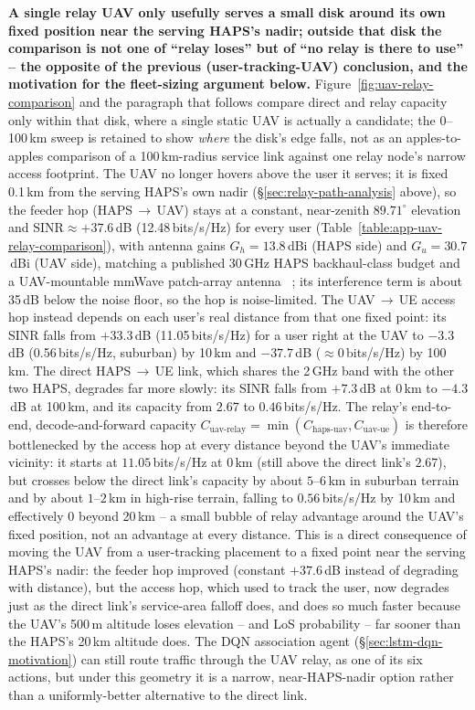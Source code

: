 \documentclass[conference]{IEEEtran}
\begin{document}
\noindent\textbf{A single relay UAV only usefully serves a small disk around its own
fixed position near the serving HAPS's nadir; outside that disk the comparison is not
one of ``relay loses'' but of ``no relay is there to use'' -- the opposite of the
previous (user-tracking-UAV) conclusion, and the motivation for the fleet-sizing argument
below.} Figure~\ref{fig:uav-relay-comparison} and the paragraph that follows compare direct
and relay capacity only within that disk, where a single static UAV is actually a
candidate; the 0--100\,km sweep is retained to show \emph{where} the disk's edge falls,
not as an apples-to-apples comparison of a 100\,km-radius service link against one relay
node's narrow access footprint.
The UAV no longer hovers above the user it serves; it is fixed 0.1\,km from the serving
HAPS's own nadir (\S\ref{sec:relay-path-analysis} above), so the feeder hop
(HAPS\,$\rightarrow$\,UAV) stays at a constant, near-zenith $89.71^\circ$ elevation and
$\mathrm{SINR}\approx+37.6$\,dB (12.48\,bits/s/Hz) for every user
(Table~\ref{table:app-uav-relay-comparison}), with antenna gains
$G_h=13.8$\,dBi (HAPS side) and $G_u=30.7$\,dBi (UAV side), matching a published 30\,GHz
HAPS backhaul-class budget and a UAV-mountable mmWave patch-array antenna
~\cite{karaman2025haps,anim2021uav}; its interference term is about 35\,dB below the noise
floor, so the hop is noise-limited. The UAV\,$\rightarrow$\,UE access hop instead depends on
each user's real distance from that one fixed point: its SINR falls from $+33.3$\,dB
(11.05\,bits/s/Hz) for a user right at the UAV to $-3.3$\,dB (0.56\,bits/s/Hz, suburban) by
10\,km and $-37.7$\,dB ($\approx$0\,bits/s/Hz) by 100\,km. The direct
HAPS\,$\rightarrow$\,UE link, which shares the 2\,GHz band with the other two HAPS, degrades
far more slowly: its SINR falls from $+7.3$\,dB at 0\,km to $-4.3$\,dB at 100\,km, and its
capacity from $2.67$ to $0.46$\,bits/s/Hz. The relay's end-to-end, decode-and-forward
capacity $C_{\text{uav-relay}}=\min(C_{\text{haps-uav}}, C_{\text{uav-ue}})$ is therefore
bottlenecked by the access hop at every distance beyond the UAV's immediate vicinity: it
starts at $11.05$\,bits/s/Hz at 0\,km (still above the direct link's $2.67$), but crosses
below the direct link's capacity by about $5$--$6$\,km in suburban terrain and by about
$1$--$2$\,km in high-rise terrain, falling to $0.56$\,bits/s/Hz by 10\,km and effectively
$0$ beyond 20\,km -- a small bubble of relay advantage around the UAV's fixed position,
not an advantage at every distance. This is a direct consequence of moving the UAV from a
user-tracking placement to a fixed point near the serving HAPS's nadir: the feeder hop
improved (constant $+37.6$\,dB instead of degrading with distance), but the access hop,
which used to track the user, now degrades just as the direct link's service-area falloff
does, and does so much faster because the UAV's 500\,m altitude loses elevation -- and LoS
probability -- far sooner than the HAPS's 20\,km altitude does. The DQN association agent
(\S\ref{sec:lstm-dqn-motivation}) can still route traffic through the UAV relay, as one of
its six actions, but under this geometry it is a narrow, near-HAPS-nadir option rather than
a uniformly-better alternative to the direct link.
\end{document}

